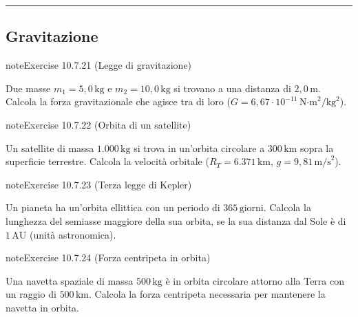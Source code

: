 \documentclass[letterpaper,10pt,italian]{jupyterBook}
\begin{document}
\bigskip\hrule\bigskip



\subsection{Gravitazione}
\label{\detokenize{ch/mechanics/dynamics-problems:gravitazione}} \label{exercise:ch/mechanics/dynamics-problems-exercise-20}

\begin{sphinxadmonition}{note}{Exercise 10.7.21 (Legge di gravitazione)}



\sphinxAtStartPar
Due masse \(m_1 = 5,0 \, \text{kg}\) e \(m_2 = 10,0 \, \text{kg}\) si trovano a una distanza di \(2,0 \, \text{m}\). Calcola la forza gravitazionale che agisce tra di loro (\(G = 6,67 \cdot 10^{-11} \, \text{N·m}^2/\text{kg}^2\)).
\end{sphinxadmonition}
 \label{exercise:ch/mechanics/dynamics-problems-exercise-21}

\begin{sphinxadmonition}{note}{Exercise 10.7.22 (Orbita di un satellite)}



\sphinxAtStartPar
Un satellite di massa \(1.000 \, \text{kg}\) si trova in un’orbita circolare a \(300 \, \text{km}\) sopra la superficie terrestre. Calcola la velocità orbitale (\(R_T = 6.371 \, \text{km}\), \(g = 9,81 \, \text{m/s}^2\)).
\end{sphinxadmonition}
 \label{exercise:ch/mechanics/dynamics-problems-exercise-22}

\begin{sphinxadmonition}{note}{Exercise 10.7.23 (Terza legge di Kepler)}



\sphinxAtStartPar
Un pianeta ha un’orbita ellittica con un periodo di \(365 \, \text{giorni}\). Calcola la lunghezza del semi\sphinxhyphen{}asse maggiore della sua orbita, se la sua distanza dal Sole è di \(1 \, \text{AU}\) (unità astronomica).
\end{sphinxadmonition}
 \label{exercise:ch/mechanics/dynamics-problems-exercise-23}

\begin{sphinxadmonition}{note}{Exercise 10.7.24 (Forza centripeta in orbita)}



\sphinxAtStartPar
Una navetta spaziale di massa \(500 \, \text{kg}\) è in orbita circolare attorno alla Terra con un raggio di \(500 \, \text{km}\). Calcola la forza centripeta necessaria per mantenere la navetta in orbita.
\end{sphinxadmonition}
 \label{exercise:ch/mechanics/dynamics-problems-exercise-24}
\end{document}

